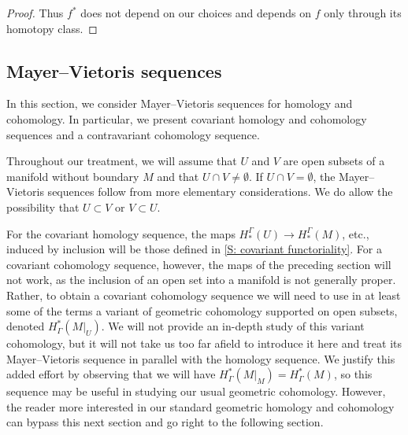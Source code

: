 \begin{proof}
	Thus $f^*$ does not depend on our choices and depends on $f$ only through its homotopy class.
\end{proof}

\begin{comment}
\begin{remark}\label{R: homology transfer}
	Analogously, given $f \colon M \to N$, one could also define a contravariant pullback functor of homology groups $f^*: H_*^\Gamma(N) \to H_*^\Gamma(M)$ if $f$ is proper and $M$ and $N$ are both oriented (so that the pullback can be oriented).
	The following lemma shows that the pullback of a compact map by a proper map is compact.
	For the orientation, we observe that given an oriented map $r_V \colon V \to N$ that represents $\uV$ and a map $g \colon M \to N$ that is properly homotopic to $f$ and transverse to $r_V$, the orientations of $V$ and $N$ induce a co-orientation on $r_V$ and so a co-orientation on the pullback $V \times_N M \to M$ by \cref{D: pullback coorient}.
	This in turn induces an orientation on $V \times_N M$ given the orientation of $M$.
\end{remark}
\end{comment}

\subsection{Mayer--Vietoris sequences}

In this section, we consider Mayer--Vietoris sequences for homology and cohomology.
In particular, we present covariant homology and cohomology sequences and a contravariant cohomology sequence.

Throughout our treatment, we will assume that $U$ and $V$ are open subsets of a manifold without boundary $M$ and that $U \cap V \neq \emptyset$.
If $U \cap V = \emptyset$, the Mayer--Vietoris sequences follow from more elementary considerations.
We do allow the possibility that $U \subset V$ or $V \subset U$.

For the covariant homology sequence, the maps $H_*^\Gamma(U) \to H_*^\Gamma(M)$, etc., induced by inclusion will be those defined in \cref{S: covariant functoriality}.
For a covariant cohomology sequence, however, the maps of the preceding section will not work, as the inclusion of an open set into a manifold is not generally proper.
Rather, to obtain a covariant cohomology sequence we will need to use in at least some of the terms a variant of geometric cohomology supported on open subsets, denoted $H^*_\Gamma(M|_U)$.
We will not provide an in-depth study of this variant cohomology, but it will not take us too far afield to introduce it here and treat its Mayer--Vietoris sequence in parallel with the homology sequence.
We justify this added effort by observing that we will have $H^*_\Gamma(M|_M) = H^*_\Gamma(M)$, so this sequence may be useful in studying our usual geometric cohomology.
However, the reader more interested in our standard geometric homology and cohomology can bypass this next section and go right to the following section.


